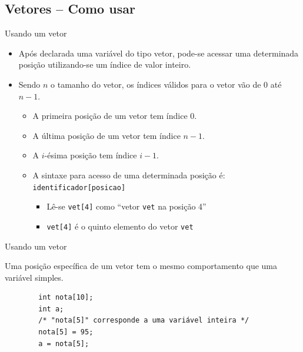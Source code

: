 \documentclass[handout]{beamer}
\newcommand{\cod}[1]{\texttt{#1}}
\begin{document}

\subsection{Vetores -- Como usar}

\begin{frame}[fragile]{Usando um vetor}

    \begin{itemize}[<+->]
        \item Após declarada uma variável do tipo vetor, pode-se acessar uma determinada posição utilizando-se um índice de valor inteiro.
        \item Sendo $n$ o tamanho do vetor, os índices válidos para o vetor vão de $0$ até $n-1$.
        \begin{itemize}
            \item A primeira posição de um vetor tem índice 0.
            \item A última posição de um vetor tem índice $n-1$.
            \item A $i$-ésima posição tem índice $i-1$.
            \item A sintaxe para acesso de uma determinada posição é:
            \cod{identificador[posicao]}
            \begin{itemize}
                \item Lê-se \cod{vet[4]} como ``vetor \cod{vet} na posição 4''
                \item \cod{vet[4]} é o quinto elemento do vetor \cod{vet}
            \end{itemize}
        \end{itemize}
    \end{itemize}

\end{frame}

\begin{frame}[fragile]{Usando um vetor}

    Uma posição específica de um vetor tem o mesmo comportamento que uma variável simples.

    \begin{verbatim}
        int nota[10];
        int a;
        /* "nota[5]" corresponde a uma variável inteira */
        nota[5] = 95;
        a = nota[5];
    \end{verbatim}

\end{frame}
\end{document}
